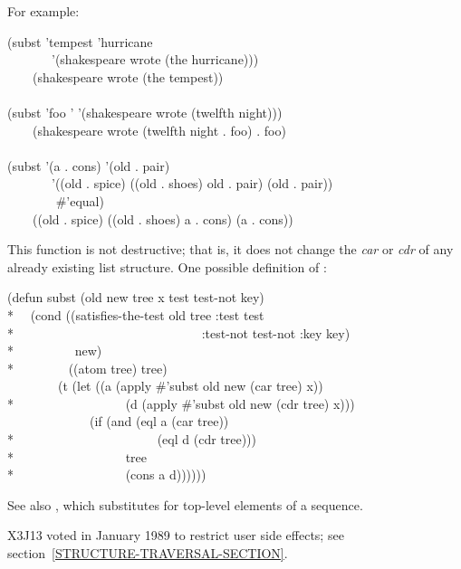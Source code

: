 \begin{defun}[Function]
For example:
\begin{lisp}
(subst 'tempest 'hurricane \\
~~~~~~~'(shakespeare wrote (the hurricane))) \\
~~~\EV\ (shakespeare wrote (the tempest)) \\
\\
(subst 'foo '{\nil} '(shakespeare wrote (twelfth night))) \\
~~~\EV\ (shakespeare wrote (twelfth night . foo) . foo) \\
\\
(subst '(a . cons) '(old . pair) \\
~~~~~~~'((old . spice) ((old . shoes) old . pair) (old . pair)) \\
~~~~~~~ \#'equal) \\
~~~\EV\ ((old . spice) ((old . shoes) a . cons) (a . cons))
\end{lisp}
This function is not destructive; that is, it does not change
the {\it car} or {\it cdr} of any already existing list structure.
One possible definition of :
\begin{lisp}
(defun subst (old new tree  x  test test-not key) \\*
~~(cond ((satisfies-the-test old tree :test test \\*
~~~~~~~~~~~~~~~~~~~~~~~~~~~~~:test-not test-not :key key) \\*
~~~~~~~~~new) \\*
~~~~~~~~((atom tree) tree) \\
~~~~~~~~(t (let ((a (apply \#'subst old new (car tree) x)) \\*
~~~~~~~~~~~~~~~~~(d (apply \#'subst old new (cdr tree) x))) \\
~~~~~~~~~~~~~(if (and (eql a (car tree)) \\*
~~~~~~~~~~~~~~~~~~~~~~(eql d (cdr tree))) \\*
~~~~~~~~~~~~~~~~~tree \\*
~~~~~~~~~~~~~~~~~(cons a d))))))
\end{lisp}
See also , which substitutes for top-level elements
of a sequence.

\begin{new}
X3J13 voted in January 1989
to restrict user side effects; see section~\ref{STRUCTURE-TRAVERSAL-SECTION}.
\end{new}
\end{defun}

